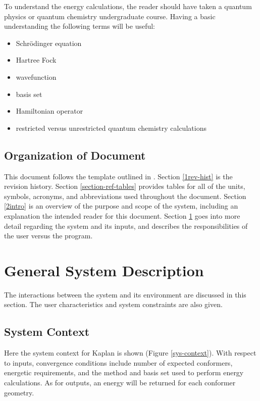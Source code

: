 \documentclass[12pt]{article}
\begin{document}
To understand the energy calculations, the reader should have taken a quantum 
physics or quantum chemistry undergraduate course. Having a basic understanding 
the following terms will be useful:
\begin{itemize}
	\item Schr\"{o}dinger equation
	\item Hartree Fock
	\item wavefunction
	\item basis set
	\item Hamiltonian operator
	\item restricted versus unrestricted quantum chemistry calculations
\end{itemize}

\subsection{Organization of Document}
This document follows the template outlined in \citet{SmithAndLai2005, 
SmithEtAl2007}. Section 
\ref{1rev-hist} is the revision history. Section \ref{section-ref-tables} 
provides tables for all of the units, symbols, acronyms, and 
abbreviations used throughout the document. Section \ref{2intro} is an overview 
of the purpose and scope of the system, including an 
explanation the intended 
reader for this document. Section \ref{3sys-desc} goes into more detail 
regarding the system and its inputs, and describes the responsibilities of the 
user versus the program. 

\section{General System Description} \label{3sys-desc}

The interactions between the system and its environment are discussed in this 
section. The user characteristics and system constraints are also given.

\subsection{System Context}

\noindent Here the system context for Kaplan is shown (Figure 
\ref{sys-context}). With 
respect to inputs, convergence conditions include number of expected 
conformers, energetic requirements, and the method and basis set used to 
perform energy calculations. As for outputs, an energy 
will be returned for each 
conformer geometry. 
\end{document}
